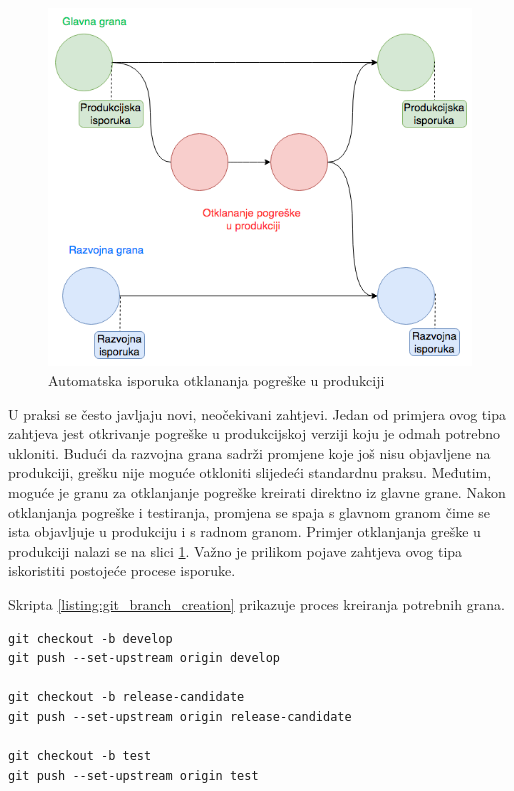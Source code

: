 \documentclass[times, utf8, diplomski, numeric]{fer}
\begin{document}
\begin{figure}[b!]
\centering
\includegraphics[scale=0.4]{HotfixGitflow}
\caption{Automatska isporuka otklananja pogreške u produkciji}
\label{fig:HotfixGitflow}
\end{figure}

U praksi se često javljaju novi, neočekivani zahtjevi. Jedan od primjera ovog tipa zahtjeva jest otkrivanje pogreške u produkcijskoj verziji koju je odmah potrebno ukloniti. Budući da razvojna grana sadrži promjene koje još nisu objavljene na produkciji, grešku nije moguće otkloniti slijedeći standardnu praksu. Međutim, moguće je granu za otklanjanje pogreške kreirati direktno iz glavne grane. Nakon otklanjanja pogreške i testiranja, promjena se spaja s glavnom granom čime se ista objavljuje u produkciju i s radnom granom. Primjer otklanjanja greške u produkciji nalazi se na slici \ref{fig:HotfixGitflow}. Važno je prilikom pojave zahtjeva ovog tipa iskoristiti postojeće procese isporuke.

Skripta \ref{listing:git_branch_creation} prikazuje proces kreiranja potrebnih grana.

\begin{lstlisting}[caption=Kreiranje potrebnih grana Gitflow radnog toka, label=listing:git_branch_creation]
git checkout -b develop
git push --set-upstream origin develop

git checkout -b release-candidate
git push --set-upstream origin release-candidate

git checkout -b test
git push --set-upstream origin test
\end{lstlisting}
\end{document}
